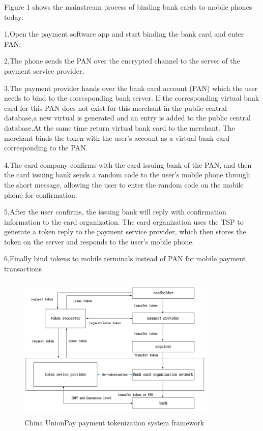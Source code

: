 \documentclass[journal]{IEEEtran}
\begin{document}
Figure 1 shows the mainstream process of binding bank cards to mobile phones today:

1,Open the payment software app and start binding the bank card and enter PAN;

2,The phone sends the PAN over the encrypted channel to the server of the payment service provider, 

3,The payment provider hands over the bank card account (PAN) which the user needs to bind to the corresponding bank server. If the corresponding virtual bank card for this PAN does not exist for this merchant in the public central database,a new virtual is generated and an entry is added to the public central database.At the same time return virtual bank card to the merchant. The merchant binds the token with the user's account as a virtual bank card corresponding to the PAN.

4,The card company confirms with the card issuing bank of the PAN, and then the card issuing bank sends a random code to the user's mobile phone through the short message, allowing the user to enter the random code on the mobile phone for confirmation.

5,After the user confirms, the issuing bank will reply with confirmation information to the card organization. The card organization uses the TSP to generate a token reply to the payment service provider, which then stores the token on the server and responds to the user's mobile phone.

6,Finally bind tokens to mobile terminals instead of PAN for mobile payment transactions


\begin{figure}[htbp]
\centerline{\includegraphics[width=9.5cm,height=7cm]{zhifubiaojikuangjia.png}}
\caption{China UnionPay payment tokenization system framework}
\label{fig}
\end{figure}
\end{document}
